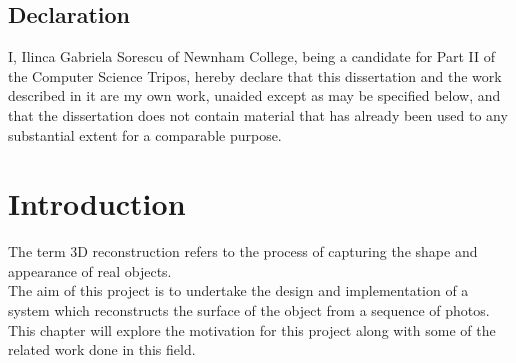 \documentclass[12pt,a4paper,twoside,openright]{report}
\begin{document}
\newpage
\section*{Declaration}

I, Ilinca Gabriela Sorescu of Newnham College, being a candidate for Part II of the Computer Science Tripos, hereby declare
that this dissertation and the work described in it are my own work,
unaided except as may be specified below, and that the dissertation
does not contain material that has already been used to any substantial
extent for a comparable purpose.

\bigskip
{}

\medskip
{}

\tableofcontents

\listoffigures

\newpage


\pagestyle{headings}
\chapter{Introduction}
The term 3D reconstruction refers to the process of capturing the shape and appearance of real objects.\\
The aim of this project is to undertake the design and implementation of a system which reconstructs the surface of the object from a sequence of photos.\\
\linebreak
This chapter will explore the motivation for this project along with some of the related work done in this field. 
\end{document}
